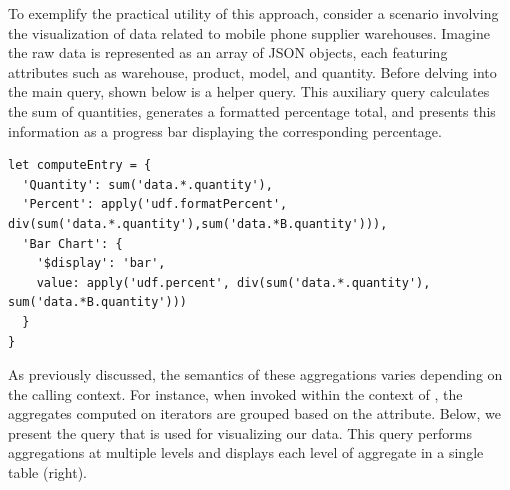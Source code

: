\documentclass[runningheads]{llncs}
\begin{document}
To exemplify the practical utility of this approach, consider a scenario involving
the visualization of data related to mobile phone supplier warehouses.
Imagine the raw data is represented as an array of JSON objects, each featuring attributes
such as warehouse, product, model, and quantity.
Before delving into the main query, shown below is a helper query.
This auxiliary query calculates the sum of quantities, generates a formatted percentage
total, and presents this information as a progress bar displaying the corresponding percentage.

\begin{lstlisting}[style=JavaScript,columns=flexible]
let computeEntry = {
  'Quantity': sum('data.*.quantity'),
  'Percent': apply('udf.formatPercent', div(sum('data.*.quantity'),sum('data.*B.quantity'))),
  'Bar Chart': {
    '$display': 'bar',
    value: apply('udf.percent', div(sum('data.*.quantity'), sum('data.*B.quantity')))
  }
}
\end{lstlisting}

As previously discussed, the semantics of these aggregations varies depending on the
calling context.
For instance, when invoked within the context of , the
aggregates computed on \inline{*} iterators are grouped based on the  attribute.
Below, we present the query that is used for visualizing our data.
This query performs aggregations at multiple levels and displays each level of
aggregate in a single table (right).
\end{document}
